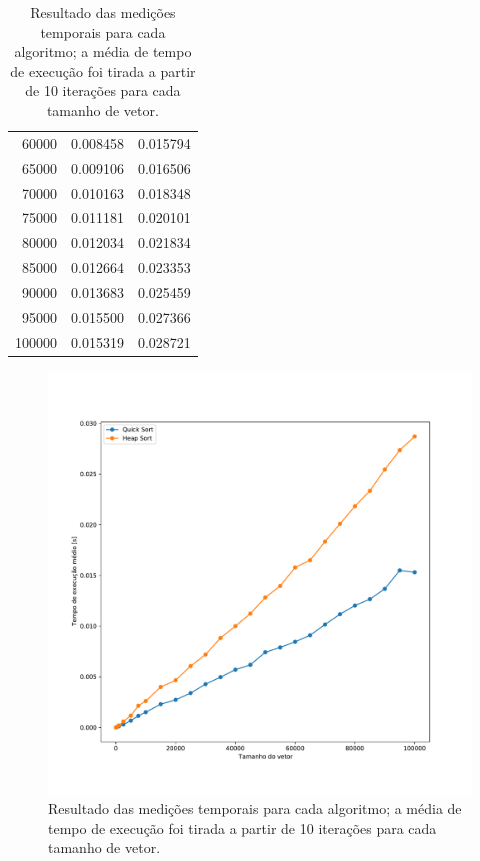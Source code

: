 \documentclass[fontsize=10pt]{article}
\begin{document}
\begin{table}[!htbp]
\begin{tabular}{@{}r|cc@{}}
60000                           & 0.008458                  & 0.015794                \\
65000                           & 0.009106                  & 0.016506                \\
70000                           & 0.010163                  & 0.018348                \\
75000                           & 0.011181                  & 0.020101                \\
80000                           & 0.012034                  & 0.021834                \\
85000                           & 0.012664                  & 0.023353                \\
90000                           & 0.013683                  & 0.025459                \\
95000                           & 0.015500                  & 0.027366                \\
100000                          & 0.015319                  & 0.028721               
\end{tabular}
\caption{Resultado das medições temporais para cada algoritmo; a média de tempo de execução foi tirada a partir de 10 iterações para cada tamanho de vetor.}
\label{Tabela 1}
\end{table}

\newpage
\begin{figure}[]
\begin{center}
    \includegraphics[scale=0.5]{comparacao_1.pdf}
    \caption{Resultado das medições temporais para cada algoritmo; a média de tempo de execução foi tirada a partir de 10 iterações para cada tamanho de vetor.}
    \label{Figura 1}
\end{center}
\end{figure}
\end{document}
